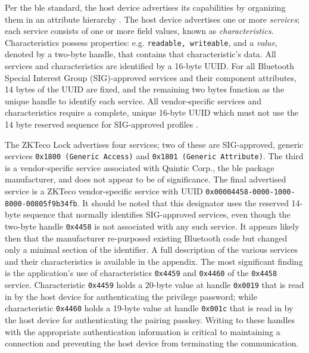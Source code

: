\documentclass[conference]{IEEEtran}
\begin{document}
\bigskip

Per the \gls{ble} standard, the host device advertises its capabilities by organizing them in an attribute hierarchy \cite{BluetoothSIG2019}.  The host device advertises one or more \textit{services}; each service consists of one or more field values, known as \textit{characteristics}.  Characteristics possess properties: e.g. \verb|readable, writeable|, and a \textit{value}, denoted by a two-byte handle, that contains that characteristic's data.  All services and characteristics are identified by a 16-byte UUID.  For all Bluetooth Special Interest Group (SIG)-approved services and their component attributes, 14 bytes of the UUID are fixed, and the remaining two bytes function as the unique handle to identify each service.  All vendor-specific services and characteristics require a complete, unique 16-byte UUID which must not use the 14 byte reserved sequence for SIG-approved profiles \cite{BluetoothSIG2019}.

\bigskip

The ZKTeco Lock advertises four services; two of these are SIG-approved, generic services \verb|0x1800 (Generic Access)| and \verb|0x1801 (Generic Attribute)|.  The third is a vendor-specific service associated with Quintic Corp., the \gls{ble} package manufacturer, and does not appear to be of significance.  The final advertised service is a ZKTeco vendor-specific service with UUID \verb|0x00004458-0000-1000-8000-00805f9b34fb|.  It should be noted that this designator uses the reserved 14-byte sequence that normally identifies SIG-approved services, even though the two-byte handle \verb|0x4458| is not associated with any such service.  It appears likely then that the manufacturer re-purposed existing Bluetooth code but changed only a minimal section of the identifier.  A full description of the various services and their characteristics is available in the appendix. The most significant finding is the application's use of characteristics \verb|0x4459| and \verb|0x4460| of the \verb|0x4458| service.  Characteristic \verb|0x4459| holds a 20-byte value at handle \verb|0x0019| that is read in by the host device for authenticating the privilege password; while characteristic \verb|0x4460| holds a 19-byte value at handle \verb|0x001c| that is read in by the host device for authenticating the pairing passkey.  Writing to these handles with the appropriate authentication information is critical to maintaining a connection and preventing the host device from terminating the communication. 
\end{document}
